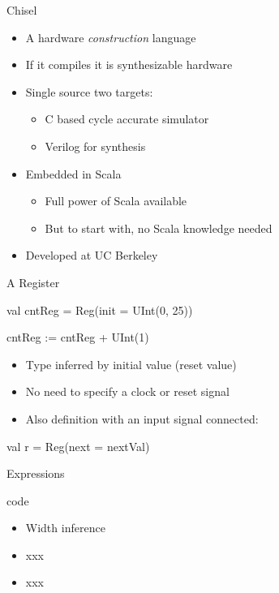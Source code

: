\documentclass[xcolor=pdflatex,dvipsnames,table]{beamer}
\begin{document}
\begin{frame}[fragile]{Chisel}
\begin{itemize}
\item A hardware \emph{construction} language
\item If it compiles it is synthesizable hardware 
\item Single source two targets:
\begin{itemize}
\item C based cycle accurate simulator
\item Verilog for synthesis
\end{itemize}
\item Embedded in Scala
\begin{itemize}
\item Full power of Scala available
\item But to start with, no Scala knowledge needed
\end{itemize}
\item Developed at UC Berkeley
\end{itemize}
\end{frame}





\begin{frame}[fragile]{A Register}
\begin{chisel}
val cntReg = Reg(init = UInt(0, 25))

cntReg := cntReg + UInt(1)
\end{chisel}
\begin{itemize}
\item Type inferred by initial value (reset value)
\item No need to specify a clock or reset signal
\end{itemize}
\begin{itemize}
\item Also definition with an input signal connected:
\end{itemize}
\begin{chisel}
val r = Reg(next = nextVal) 
\end{chisel}

\end{frame}

\begin{frame}[fragile]{Expressions}
\begin{chisel}
code
\end{chisel}
\begin{itemize}
\item Width inference
\item xxx
\item xxx
\end{itemize}
\end{frame}
\end{document}
